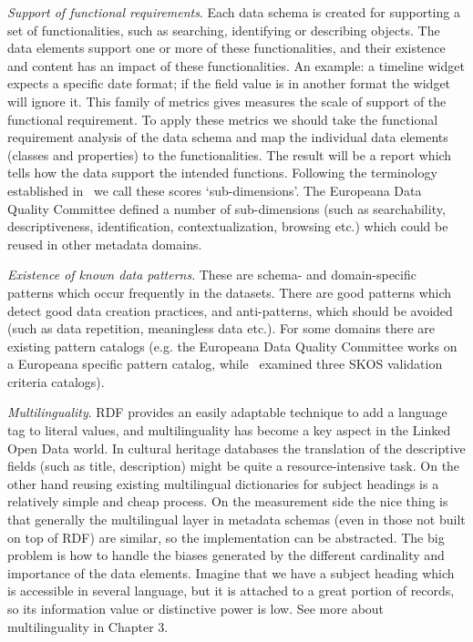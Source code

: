\emph{Support of functional requirements}. Each data schema is created for supporting a set of functionalities, such as searching, identifying or describing objects. The data elements support one or more of these functionalities, and their existence and content has an impact of these functionalities. An example: a timeline widget expects a specific date format; if the field value is in another format the widget will ignore it. This family of metrics gives measures the scale of support of the functional requirement. To apply these metrics we should take the functional requirement analysis of the data schema and map the individual data elements (classes and properties) to the functionalities. The result will be a report which tells how the data support the intended functions. Following the terminology established in~\cite{gavrilis2015} we call these scores `sub-dimensions’. The Europeana Data Quality Committee defined a number of sub-dimensions (such as searchability, descriptiveness, identification, contextualization, browsing etc.) which could be reused in other metadata domains.

\emph{Existence of known data patterns}. These are schema- and domain-specific patterns which occur frequently in the datasets. There are good patterns which detect good data creation practices, and anti-patterns, which should be avoided (such as data repetition, meaningless data etc.). For some domains there are existing pattern catalogs (e.g. the Europeana Data Quality Committee works on a Europeana specific pattern catalog, while~\cite{suominen2012}  examined three SKOS validation criteria catalogs).

\emph{Multilinguality}. RDF provides an easily adaptable technique to add a language tag to literal values, and multilinguality has become a key aspect in the Linked Open Data world. In cultural heritage databases the translation of the descriptive fields (such as title, description) might be quite a resource-intensive task. On the other hand reusing existing multilingual dictionaries for subject headings is a relatively simple and cheap process. On the measurement side the nice thing is that generally the multilingual layer in metadata schemas (even in those not built on top of RDF) are similar, so the implementation can be abstracted. The big problem is how to handle the biases generated by the different cardinality and importance of the data elements. Imagine that we have a subject heading which is accessible in several language, but it is attached to a great portion of records, so its information value or distinctive power is low. See more about multilinguality in Chapter 3.

